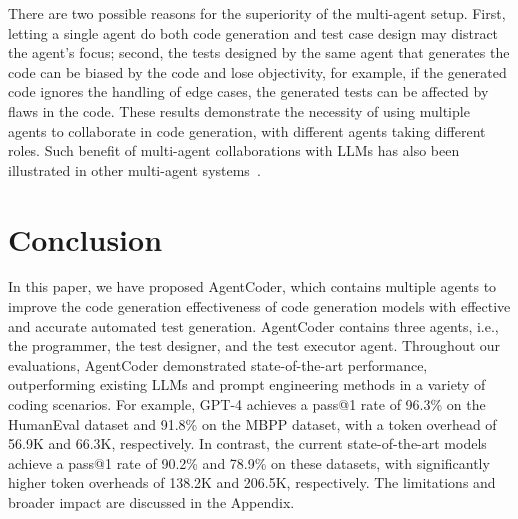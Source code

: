 \documentclass{article}
\newcommand{\xxx}{AgentCoder\xspace}
\begin{document}
There are two possible reasons for the superiority of the multi-agent setup. First, letting a single agent do both code generation and test case design may distract the agent's focus; second, the tests designed by the same agent that generates the code can be biased by the code and lose objectivity, for example, if the generated code ignores the handling of edge cases, the generated tests can be affected by flaws in the code.
These results demonstrate the necessity of using multiple agents to collaborate in code generation, with different agents taking different roles.
{\color{black}Such benefit of multi-agent collaborations with LLMs has also been illustrated in other multi-agent systems~\cite{Chen2023AgentVerseFM,Zhang2023ProAgentBP}.}

\section{Conclusion}

In this paper, we have proposed \xxx, which contains multiple agents to improve the code generation effectiveness of code generation models with effective and accurate automated test generation. \xxx contains three agents, i.e., the programmer, the test designer, and the test executor agent. 
Throughout our evaluations, \xxx demonstrated state-of-the-art performance, outperforming existing LLMs and prompt engineering methods in a variety of coding scenarios. For example, GPT-4 achieves a pass@1 rate of 96.3\% on the HumanEval dataset and 91.8\% on the MBPP dataset, with a token overhead of 56.9K and 66.3K, respectively. In contrast, the current state-of-the-art models achieve a pass@1 rate of 90.2\% and 78.9\% on these datasets, with significantly higher token overheads of 138.2K and 206.5K, respectively.
The limitations and broader impact are discussed in the Appendix. 




\newpage
\clearpage
\appendix

\end{document}
